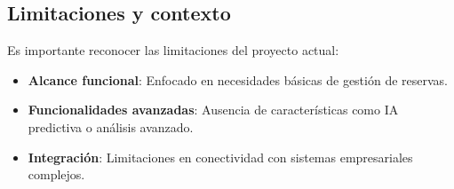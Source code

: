 \subsection{Limitaciones y contexto}\label{limitaciones-contexto}
Es importante reconocer las limitaciones del proyecto actual:

\begin{itemize}
\tightlist
\item
\textbf{Alcance funcional}: Enfocado en necesidades básicas de gestión de reservas.
\item
\textbf{Funcionalidades avanzadas}: Ausencia de características como IA predictiva o análisis avanzado.
\item
\textbf{Integración}: Limitaciones en conectividad con sistemas empresariales complejos.
\end{itemize}
